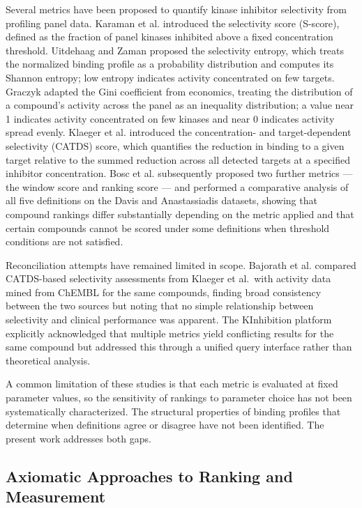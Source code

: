 \documentclass[journal=jcisd8,manuscript=article]{achemso}
\begin{document}
Several metrics have been proposed to quantify kinase inhibitor selectivity
from profiling panel data.
Karaman et al.\cite{Karaman2008} introduced the selectivity score (S-score),
defined as the fraction of panel kinases inhibited above a fixed concentration
threshold.
Uitdehaag and Zaman\cite{Uitdehaag2011} proposed the selectivity entropy,
which treats the normalized binding profile as a probability distribution and
computes its Shannon entropy; low entropy indicates activity concentrated on
few targets.
Graczyk\cite{Graczyk2010} adapted the Gini coefficient from economics, treating
the distribution of a compound's activity across the panel as an inequality
distribution; a value near 1 indicates activity concentrated on few kinases and
near 0 indicates activity spread evenly.
Klaeger et al.\cite{Klaeger2017} introduced the concentration- and
target-dependent selectivity (CATDS) score, which quantifies the reduction in
binding to a given target relative to the summed reduction across all detected
targets at a specified inhibitor concentration.
Bosc et al.\cite{Bosc2017} subsequently proposed two further metrics ---
the window score and ranking score --- and performed a comparative analysis of
all five definitions on the Davis and Anastassiadis datasets, showing that
compound rankings differ substantially depending on the metric applied and that
certain compounds cannot be scored under some definitions when threshold
conditions are not satisfied.

Reconciliation attempts have remained limited in scope.
Bajorath et al.\cite{Bajorath2018} compared CATDS-based selectivity
assessments from Klaeger et al.\ with activity data mined from ChEMBL for the
same compounds, finding broad consistency between the two sources but noting
that no simple relationship between selectivity and clinical performance was
apparent.
The KInhibition platform\cite{KInhibition2018} explicitly acknowledged that
multiple metrics yield conflicting results for the same compound but addressed
this through a unified query interface rather than theoretical analysis.

A common limitation of these studies is that each metric is evaluated at fixed
parameter values, so the sensitivity of rankings to parameter choice has not
been systematically characterized.
The structural properties of binding profiles that determine when definitions
agree or disagree have not been identified.
The present work addresses both gaps.

\subsection{Axiomatic Approaches to Ranking and Measurement}
\label{sec:related:axiomatic}
\end{document}

